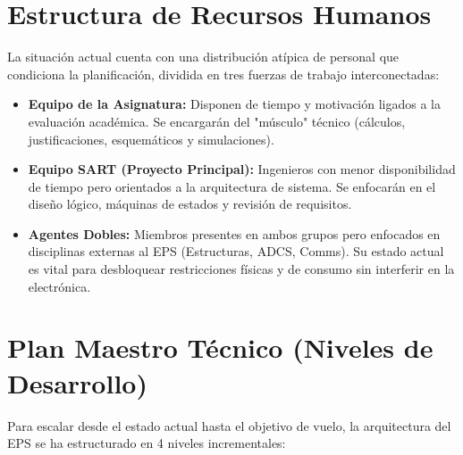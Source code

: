 \section{Estructura de Recursos Humanos}
La situación actual cuenta con una distribución atípica de personal que condiciona la planificación, dividida en tres fuerzas de trabajo interconectadas:
\begin{itemize}
    \item \textbf{Equipo de la Asignatura:} Disponen de tiempo y motivación ligados a la evaluación académica. Se encargarán del "músculo" técnico (cálculos, justificaciones, esquemáticos y simulaciones).
    \item \textbf{Equipo SART (Proyecto Principal):} Ingenieros con menor disponibilidad de tiempo pero orientados a la arquitectura de sistema. Se enfocarán en el diseño lógico, máquinas de estados y revisión de requisitos.
    \item \textbf{Agentes Dobles:} Miembros presentes en ambos grupos pero enfocados en disciplinas externas al EPS (Estructuras, ADCS, Comms). Su estado actual es vital para desbloquear restricciones físicas y de consumo sin interferir en la electrónica.
\end{itemize}

\section{Plan Maestro Técnico (Niveles de Desarrollo)}
Para escalar desde el estado actual hasta el objetivo de vuelo, la arquitectura del EPS se ha estructurado en 4 niveles incrementales:

